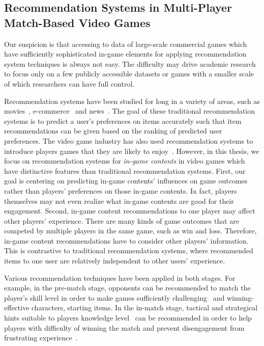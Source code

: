 

\subsection{Recommendation Systems in Multi-Player Match-Based Video Games}

Our suspicion is that accessing to data of large-scale commercial games which have sufficiently sophisticated in-game elements for applying recommendation system techniques is always not easy. The difficulty may drive academic research to focus only on a few publicly accessible datasets or games with a smaller scale of which researchers can have full control.

Recommendation systems have been studied for long in a variety of areas, such as movies~\cite{amatriain2012netflix}, e-commerce~\cite{linden2003amazon} and news~\cite{das2007google}. The goal of these traditional recommendation systems is to predict a user's preferences on items accurately such that item recommendations can be given based on the ranking of predicted user preferences. The video game industry has also used recommendation systems to introduce players games that they are likely to enjoy~\cite{sifa2014archetypal,orland10}. However, in this thesis, we focus on recommendation systems for \textit{in-game contents} in video games which have distinctive features than traditional recommendation systems. First, our goal is centering on predicting in-game contents' influences on game outcomes rather than players' preferences on those in-game contents. In fact, players themselves may not even realize what in-game contents are good for their engagement. Second, in-game content recommendations to one player may affect other players' experience. There are many kinds of game outcomes that are competed by multiple players in the same game, such as win and loss. Therefore, in-game content recommendations have to consider other players' information. This is contrastive to traditional recommendation systems, where recommended items to one user are relatively independent to other users' experience.

Various recommendation techniques have been applied in both stages. For example, in the pre-match stage, opponents can be recommended to match the player's skill level in order to make games sufficiently challenging~\cite{sweetser2005gameflow,flow1990psychology,chen2007flow} and winning-effective characters, starting items. In the in-match stage, tactical and strategical hints suitable to players knowledge level~\cite{weber2009data,cunha2014rtsmate} can be recommended in order to help players with difficulty of winning the match and prevent disengagement from frustrating experience~\cite{schoenau2011player}.



